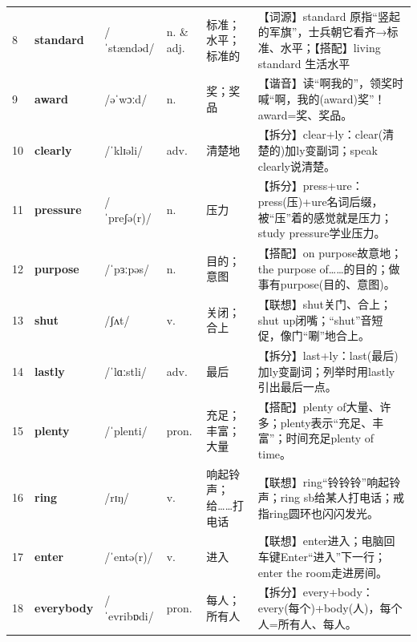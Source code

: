 \documentclass[UTF8,a4paper,11pt,oneside]{ctexbook}
\newcommand{\cellword}[1]{{\bfseries\textcolor{wordcol}{#1}}}
\newcommand{\cellipa}[1]{{\footnotesize\textcolor{ipacol}{#1}}}
\newcommand{\cellpos}[1]{\textcolor{poscol}{#1}}
\newcommand{\cellno}[1]{\textcolor{volcolor!75!black}{#1}}
\begin{document}
{\begin{longtable}{@{}C{0.045\textwidth}L{0.155\textwidth}L{0.175\textwidth}C{0.070\textwidth}L{0.180\textwidth}L{0.282\textwidth}@{}}
\cellno{8} & \cellword{standard} & \cellipa{/ˈstændəd/} & \cellpos{n.  \& adj.} & 标准；水平；标准的 & \textcolor{tagEtym}{【词源】}standard 原指“竖起的军旗”，士兵朝它看齐→\allowbreak{}标准、水平；\textcolor{tagColloc}{【搭配】}living standard 生活水平 \\
 \cellno{9} & \cellword{award} & \cellipa{/əˈwɔːd/} & \cellpos{n.} & 奖；奖品 & \textcolor{tagSound}{【谐音】}读“啊我的”，领奖时喊“啊，我的(award)奖”！award=奖、奖品。 \\
\cellno{10} & \cellword{clearly} & \cellipa{/ˈklɪəli/} & \cellpos{adv.} & 清楚地 & \textcolor{tagSplit}{【拆分】}clear+ly：clear(清楚的)加ly变副词；speak clearly说清楚。 \\
 \cellno{11} & \cellword{pressure} & \cellipa{/ˈpreʃə(r)/} & \cellpos{n.} & 压力 & \textcolor{tagSplit}{【拆分】}press+ure：press(压)+ure名词后缀，被“压”着的感觉就是压力；study pressure学业压力。 \\
\cellno{12} & \cellword{purpose} & \cellipa{/ˈpɜːpəs/} & \cellpos{n.} & 目的；意图 & \textcolor{tagColloc}{【搭配】}on purpose故意地；the purpose of……的目的；做事有purpose(目的、意图)。 \\
 \cellno{13} & \cellword{shut} & \cellipa{/ʃʌt/} & \cellpos{v.} & 关闭；合上 & \textcolor{tagAssoc}{【联想】}shut关门、合上；shut up闭嘴；“shut”音短促，像门“唰”地合上。 \\
\cellno{14} & \cellword{lastly} & \cellipa{/ˈlɑːstli/} & \cellpos{adv.} & 最后 & \textcolor{tagSplit}{【拆分】}last+ly：last(最后)加ly变副词；列举时用lastly引出最后一点。 \\
 \cellno{15} & \cellword{plenty} & \cellipa{/ˈplenti/} & \cellpos{pron.} & 充足；丰富；大量 & \textcolor{tagColloc}{【搭配】}plenty of大量、许多；plenty表示“充足、丰富”；时间充足plenty of time。 \\
\cellno{16} & \cellword{ring} & \cellipa{/rɪŋ/} & \cellpos{v.} & 响起铃声；给……打电话 & \textcolor{tagAssoc}{【联想】}ring“铃铃铃”响起铃声；ring sb给某人打电话；戒指ring圆环也闪闪发光。 \\
 \cellno{17} & \cellword{enter} & \cellipa{/ˈentə(r)/} & \cellpos{v.} & 进入 & \textcolor{tagAssoc}{【联想】}enter进入；电脑回车键Enter“进入”下一行；enter the room走进房间。 \\
\cellno{18} & \cellword{everybody} & \cellipa{/ˈevribɒdi/} & \cellpos{pron.} & 每人；所有人 & \textcolor{tagSplit}{【拆分】}every+body：every(每个)+body(人)，每个人=所有人、每人。 \\

\end{longtable}}
\end{document}
